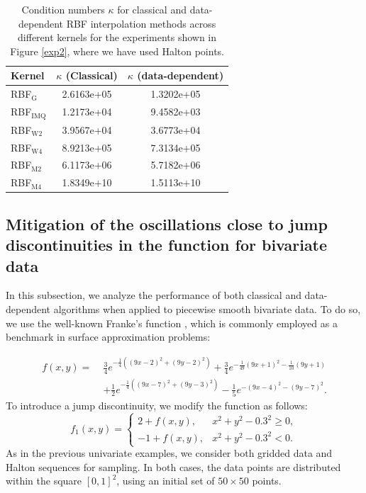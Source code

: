 \documentclass[preprint]{elsarticle}       %
\begin{document}
\begin{table}[ht]
\centering
\begin{tabular}{|l|c|c|}
\hline
\textbf{Kernel} & $\kappa$ \textbf{(Classical)} & $\kappa$ \textbf{(data-dependent)} \\
\hline
RBF$_{\text{G}}$ & 2.6163e+05 & 1.3202e+05 \\
RBF$_{\text{IMQ}}$ & 1.2173e+04 & 9.4582e+03 \\
RBF$_{\text{W2}}$ & 3.9567e+04 & 3.6773e+04 \\
RBF$_{\text{W4}}$ & 8.9213e+05 & 7.3134e+05 \\
RBF$_{\text{M2}}$ & 6.1173e+06 & 5.7182e+06 \\
RBF$_{\text{M4}}$ & 1.8349e+10 & 1.5113e+10 \\
\hline
\end{tabular}
\caption{Condition numbers $\kappa$ for classical and data-dependent RBF interpolation methods across different kernels for the experiments shown in Figure \ref{exp2}, where we have used Halton points.}
\label{tabla_condicion_no_unif}
\end{table}


\subsection{Mitigation of the oscillations close to jump discontinuities in the function for bivariate data}

In this subsection, we analyze the performance of both classical and data-dependent algorithms when applied to piecewise smooth bivariate data. To do so, we use the well-known Franke's function \cite{Franke}, which is commonly employed as a benchmark in surface approximation problems:

\begin{equation}\label{frankesfunction}
\begin{split}
f(x,y) =\;& \frac{3}{4} e^{- \frac{1}{4}((9x - 2)^2 + (9y - 2)^2)} + \frac{3}{4} e^{- \frac{1}{49}(9x + 1)^2 - \frac{1}{10}(9y + 1)} \\
& + \frac{1}{2} e^{- \frac{1}{4}((9x - 7)^2 + (9y - 3)^2)} - \frac{1}{5} e^{-(9x - 4)^2 - (9y - 7)^2}.
\end{split}
\end{equation}
To introduce a jump discontinuity, we modify the function as follows:
\begin{equation}\label{frankesdisc}
f_1(x,y) = \left\{
\begin{array}{ll}
2 + f(x,y), & x^2 + y^2 - 0.3^2 \geq 0, \\
-1 + f(x,y), & x^2 + y^2 - 0.3^2 < 0.
\end{array}
\right.
\end{equation}
As in the previous univariate examples, we consider both gridded data and Halton sequences for sampling. In both cases, the data points are distributed within the square $[0,1]^2$, using an initial set of $50 \times 50$ points.
\end{document}
